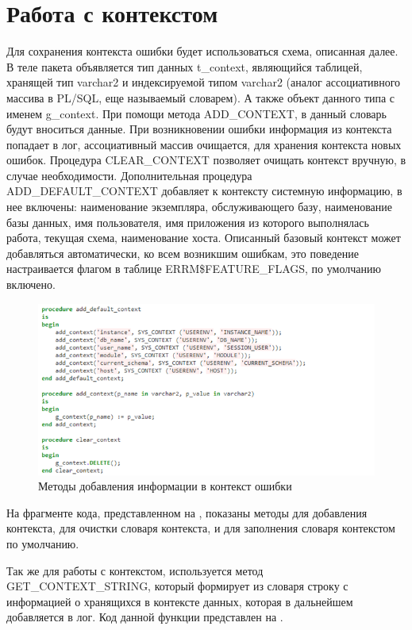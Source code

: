 \section{Работа с контекстом} \label{ch3:sec8}

Для сохранения контекста ошибки будет использоваться схема, описанная далее. В теле пакета объявляется тип данных t\_context, являющийся таблицей, хранящей тип varchar2 и индексируемой типом varchar2 (аналог ассоциативного массива в PL/SQL, еще называемый словарем). А также объект данного типа с именем g\_context. При помощи метода ADD\_CONTEXT, в данный словарь будут вноситься данные. При возникновении ошибки информация из контекста попадает в лог, ассоциативный массив очищается, для хранения контекста новых ошибок. Процедура CLEAR\_CONTEXT позволяет очищать контекст вручную, в случае необходимости. 
Дополнительная процедура ADD\_DEFAULT\_CONTEXT добавляет к контексту системную информацию, в нее включены: наименование экземпляра, обслуживающего базу, наименование базы данных, имя пользователя, имя приложения из которого выполнялась работа, текущая схема, наименование хоста. Описанный базовый контекст может добавляться автоматически, ко всем возникшим ошибкам, это поведение настраивается флагом в таблице ERRM\$FEATURE\_FLAGS, по умолчанию включено.  

\begin{figure}[ht!] 
	\center
	\includegraphics [scale=1] {my_folder/img/c3_add_context_code.png}
	\caption{Методы добавления информации в контекст ошибки} 
	\label{fig:c3_add_context_code}  
\end{figure}
\FloatBarrier

На фрагменте кода, представленном на , показаны методы для добавления контекста, для очистки словаря контекста, и для заполнения словаря контекстом по умолчанию. 

Так же для работы с контекстом, используется метод GET\_CONTEXT\_STRING, который формирует из словаря строку с информацией о хранящихся в контексте данных, которая в дальнейшем добавляется в лог. Код данной функции представлен на .


